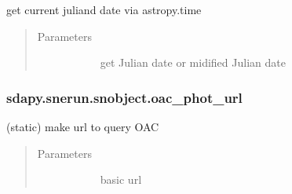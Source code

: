 \documentclass[letterpaper,10pt,english]{sphinxmanual}
\begin{document}
\begin{fulllineitems}
\begin{fulllineitems}
\label{\detokenize{generated/sdapy.snerun.snobject.mjd_now:sdapy.snerun.snobject.mjd_now}}
get current juliand date via astropy.time
\begin{quote}\begin{description}
\item[{Parameters}] \leavevmode\begin{description}
\item[{}] \leavevmode{[}\sphinxtitleref{bool}{]}
get Julian date or midified Julian date

\end{description}

\end{description}\end{quote}

\end{fulllineitems}



\subsubsection{sdapy.snerun.snobject.oac\_phot\_url}
\label{\detokenize{generated/sdapy.snerun.snobject.oac_phot_url:sdapy-snerun-snobject-oac-phot-url}}\label{\detokenize{generated/sdapy.snerun.snobject.oac_phot_url::doc}}

\begin{fulllineitems}
\label{\detokenize{generated/sdapy.snerun.snobject.oac_phot_url:sdapy.snerun.snobject.oac_phot_url}}
(static) make url to query OAC
\begin{quote}\begin{description}
\item[{Parameters}] \leavevmode\begin{description}
\item[{}] \leavevmode{[}\sphinxtitleref{str}{]}
basic url

\end{description}

\end{description}\end{quote}


\end{fulllineitems}
\end{fulllineitems}
\end{document}

